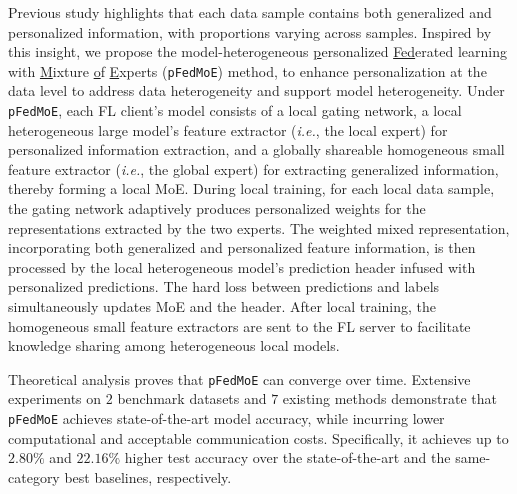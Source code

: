 \documentclass[sigconf]{acmart}
\newcommand{\pers}{personalized }
\newcommand{\gen}{generalized }
\newcommand{\heteroN}{heterogeneity }
\newcommand{\methodname}{{\tt{pFedMoE}}}
\begin{document}
Previous study \cite{FedCP} highlights that each data sample contains both generalized and personalized information, with proportions varying across samples. Inspired by this insight, we propose the model-heterogeneous \underline{p}ersonalized \underline{Fed}erated learning with \underline{M}ixture \underline{o}f \underline{E}xperts (\methodname{}) method, to enhance personalization at the data level to address data \heteroN and support model heterogeneity.
Under \methodname{}, each FL client's model consists of a local gating network, a local heterogeneous large model's feature extractor (\emph{i.e.}, the local expert) for personalized information extraction, and a globally shareable homogeneous small feature extractor (\emph{i.e.}, the global expert) for extracting generalized information, thereby forming a local MoE. During local training, for each local data sample, the gating network adaptively produces personalized weights for the representations extracted by the two experts. The weighted mixed representation,  incorporating both \gen and \pers feature information, is then processed by the local heterogeneous model's prediction header infused with personalized predictions. The hard loss between predictions and labels simultaneously updates MoE and the header. 
After local training, the homogeneous small feature extractors are sent to the FL server to facilitate knowledge sharing among heterogeneous local models.

Theoretical analysis proves that \methodname{} can converge over time.
Extensive experiments on $2$ benchmark datasets and $7$ existing methods demonstrate that \methodname{} achieves state-of-the-art model accuracy, while incurring lower computational and acceptable communication costs. Specifically, it achieves up to $2.80\%$ and $22.16\%$ higher test accuracy over the state-of-the-art and the same-category best baselines, respectively.

\end{document}
